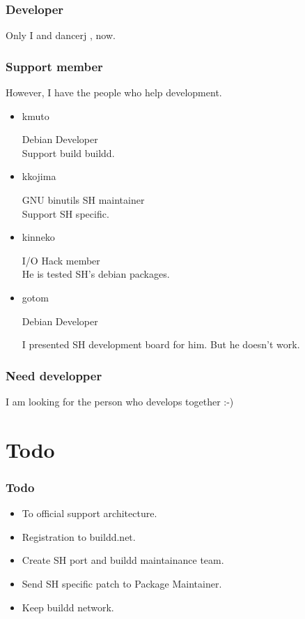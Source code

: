 \documentclass[cjk,dvipdfmx,12pt]{beamer}
\begin{document}
\begin{frame}
 \frametitle{Developer}
  Only I and dancerj , now.
 
\end{frame}

\begin{frame}
 \frametitle{Support member}
  However, I have the people who help development. 
 \begin{itemize}
  \item kmuto

	Debian Developer \\
	Support build buildd.

  \item kkojima

	GNU binutils SH maintainer \\
	Support SH specific.

  \item kinneko

	I/O Hack member\\
	He is tested SH's debian packages.	

  \item gotom
 
 	Debian Developer

	I presented SH development board for him. But he doesn't work.

%
	
	
 \end{itemize}
\end{frame}


\begin{frame}
 \frametitle{Need developper}
 I am looking for the person who develops together :-)

\end{frame}


\section{Todo}
\begin{frame}
 \frametitle{Todo}

   \begin{itemize}
    \item To official support architecture.
    \item Registration to buildd.net.
    \item Create SH port and buildd maintainance team.
    \item Send SH specific patch to Package Maintainer.
    \item Keep buildd network.
   \end{itemize}
\end{frame}
\end{document}
